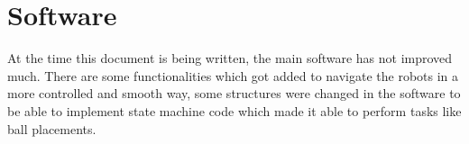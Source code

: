\section{Software}
\setlength\intextsep{0pt}
At the time this document is being written, the main software has not improved much. There are some functionalities which got added to navigate the robots in a more controlled and smooth way, some structures were changed in the software to be able to implement state machine code which made it able to perform tasks like ball placements.


%
%
%
%
%
%
%
